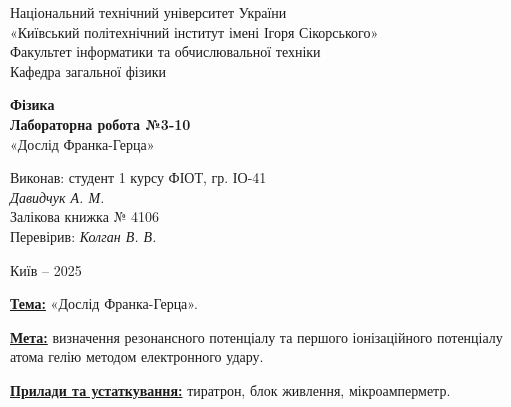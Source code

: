 \documentclass[12pt,a4paper]{article}
\begin{document}
    \begin{titlepage}

        \thispagestyle{empty}
        \begin{center}
        \large
            Національний технічний університет України\\
            «Київський політехнічний інститут імені Ігоря Сікорського»\\[1em]
            Факультет інформатики та обчислювальної техніки\\
            Кафедра загальної фізики
        \end{center}

        \vfill

        \begin{center}
        \textbf{\huge Фізика}\\[2em]
        \textbf{\Large Лабораторна робота №3-10}\\[0.5em]
        «Дослід Франка-Герца» 
        \end{center}

        \vfill

        \begin{flushright}
        Виконав: студент 1 курсу ФІОТ, гр. ІО-41\\
        \textit{Давидчук А. М.}\\
        Залікова книжка № 4106\\[1em]
        Перевірив: \textit{Колган В. В.}
        \end{flushright}

        \vfill

        \begin{center}
        Київ -- 2025
        \end{center}

    \end{titlepage}

    \setlength{\parindent}{0pt}

    \textbf{\underline{Тема:}} «Дослід Франка-Герца».

    \vspace{1em}

    \textbf{\underline{Мета:}} визначення резонансного потенціалу та першого іонізаційного потенціалу атома гелію методом електронного удару.

    \vspace{1em}

    \textbf{\underline{Прилади та устаткування:}} тиратрон, блок живлення, мікроамперметр.
\end{document}
